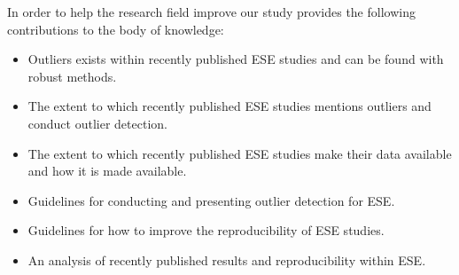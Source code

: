 In order to help the research field improve our study provides the following contributions to the body of knowledge:
\begin{itemize}
        \item Outliers exists within recently published ESE studies and can be found with robust methods.




        \item The extent to which recently published ESE studies mentions outliers and conduct outlier detection.




        \item The extent to which recently published ESE studies make their data available and how it is made available.




        \item Guidelines for conducting and presenting outlier detection for ESE\@.




        \item Guidelines for how to improve the reproducibility of ESE studies.




        \item An analysis of recently published results and reproducibility within ESE\@.
\end{itemize}
